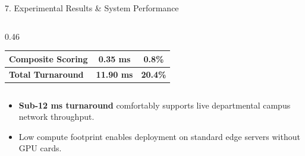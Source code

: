 ﻿\documentclass[aspectratio=169, 10pt]{beamer}
\begin{document}
\begin{frame}{7. Experimental Results \& System Performance}
\begin{columns}
\begin{column}{0.46\textwidth}
\begin{table}[h]
\begin{tabular}{lcc}
                    Composite Scoring & 0.35 ms & 0.8\% \\
                    \midrule
                    \textbf{Total Turnaround} & \textbf{11.90 ms} & \textbf{20.4\%} \\
                    \bottomrule
                \end{tabular}
            \end{table}
        \end{column}
    \end{columns}
    \vspace{0.3cm}
    \begin{itemize}
        \item \textbf{Sub-12 ms turnaround} comfortably supports live departmental campus network throughput.
        \item Low compute footprint enables deployment on standard edge servers without GPU cards.
    \end{itemize}
\end{frame}
\end{document}
